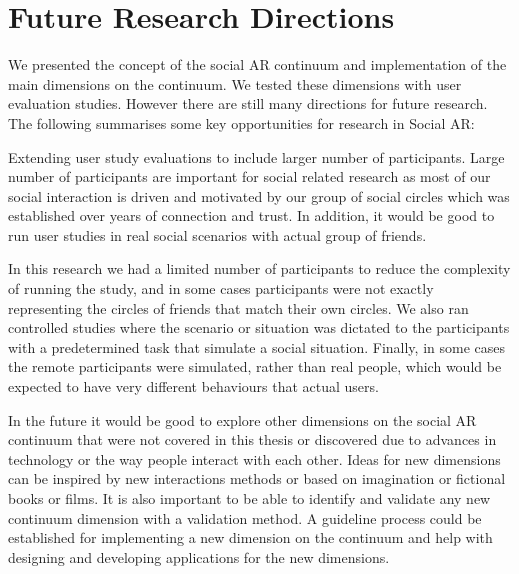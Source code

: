 

\section{Future Research Directions}

We presented the concept of the social AR continuum and implementation of the main dimensions on the continuum. We tested these dimensions with user evaluation studies. However there are still many directions for future research. The following summarises some key opportunities for research in Social AR:  

Extending user study evaluations to include larger number of participants. Large number of participants are important for social related research as most of our social interaction is driven and motivated by our group of social circles which was established over years of connection and trust.  In addition, it would be good to run user studies in real social scenarios with actual group of friends.

In this research we had a limited number of participants to reduce the complexity of running the study, and in some cases participants were not exactly representing the circles of friends that match their own circles. We also ran controlled studies where the scenario or situation was dictated to the participants with a predetermined task that simulate a social situation. Finally, in some cases the remote participants were simulated, rather than real people, which would be expected to have very different behaviours that actual users.

In the future it would be good to explore other dimensions on the social AR continuum that were not covered in this thesis or discovered due to advances in technology or the way people interact with each other. 
Ideas for new dimensions can be inspired by new interactions methods or based on imagination or fictional books or films. 
It is also important to be able to identify and validate any new continuum dimension with a validation method. A guideline process could be established for implementing a new dimension on the continuum and help with designing and developing applications for the new dimensions. 

